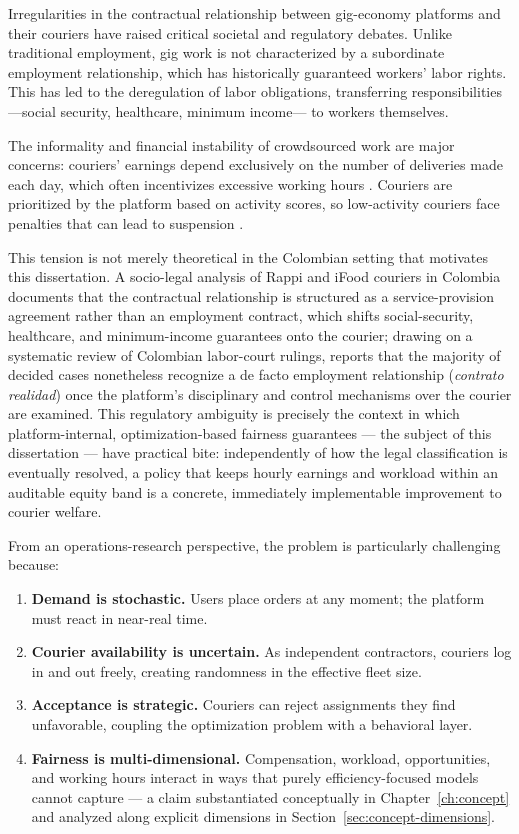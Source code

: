 \documentclass[12pt,a4paper]{report}
\begin{document}
Irregularities in the contractual relationship between gig-economy platforms and their couriers have raised critical societal and regulatory debates. Unlike traditional employment, gig work is not characterized by a subordinate employment relationship, which has historically guaranteed workers' labor rights. This has led to the deregulation of labor obligations, transferring responsibilities ---social security, healthcare, minimum income--- to workers themselves.

The informality and financial instability of crowdsourced work are major concerns: couriers' earnings depend exclusively on the number of deliveries made each day, which often incentivizes excessive working hours \citep{Berg2019}. Couriers are prioritized by the platform based on activity scores, so low-activity couriers face penalties that can lead to suspension \citep{canada2023}.

This tension is not merely theoretical in the Colombian setting that motivates this dissertation. A socio-legal analysis of Rappi and iFood couriers in Colombia \citep{bejarano2021trabajo} documents that the contractual relationship is structured as a service-provision agreement rather than an employment contract, which shifts social-security, healthcare, and minimum-income guarantees onto the courier; drawing on a systematic review of Colombian labor-court rulings, \citet{bejarano2021trabajo} reports that the majority of decided cases nonetheless recognize a de facto employment relationship (\emph{contrato realidad}) once the platform's disciplinary and control mechanisms over the courier are examined. This regulatory ambiguity is precisely the context in which platform-internal, optimization-based fairness guarantees --- the subject of this dissertation --- have practical bite: independently of how the legal classification is eventually resolved, a policy that keeps hourly earnings and workload within an auditable equity band is a concrete, immediately implementable improvement to courier welfare.

From an operations-research perspective, the problem is particularly challenging because:
\begin{enumerate}
    \item \textbf{Demand is stochastic.} Users place orders at any moment; the platform must react in near-real time.
    \item \textbf{Courier availability is uncertain.} As independent contractors, couriers log in and out freely, creating randomness in the effective fleet size.
    \item \textbf{Acceptance is strategic.} Couriers can reject assignments they find
    unfavorable, coupling the optimization problem with a behavioral layer.
    \item \textbf{Fairness is multi-dimensional.} Compensation, workload, opportunities, and
    working hours interact in ways that purely efficiency-focused models cannot capture --- a claim substantiated conceptually in Chapter~\ref{ch:concept} and analyzed along explicit dimensions in Section~\ref{sec:concept-dimensions}.
\end{enumerate}
\end{document}
